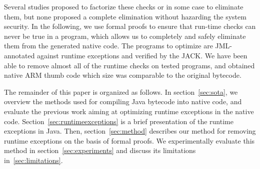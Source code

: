 Several studies proposed to factorize these checks or in some case to eliminate them, but none proposed a complete elimination without hazarding the system security.
 In the following, we use formal proofs to ensure that run-time checks can never be true in a program, which allows us to completely and safely eliminate them from the generated native code.
 The programs to optimize are JML-annotated against runtime exceptions and verified by the JACK. We have been able to remove almost all of the runtime 
 checks on tested programs, and obtained native ARM thumb code which size was comparable to the original bytecode.

The remainder of this paper is organized as follows. In section~\ref{sec:sota}, we overview the methods used for compiling Java bytecode into native code,
 and evaluate the previous work aiming at optimizing runtime exceptions in the native code. Section~\ref{sec:runtimeexceptions} is a brief presentation 
of the runtime exceptions in Java. 
Then, section~\ref{sec:method} describes our method for removing runtime exceptions on the basis of formal proofs. We experimentally evaluate this method in 
section~\ref{sec:experiments} and discuss its limitations in~\ref{sec:limitations}.
